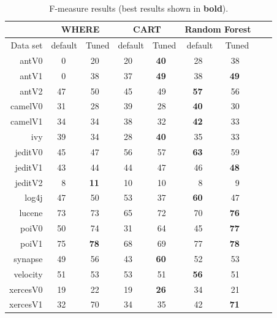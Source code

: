 \documentclass[final,twocolumn,5p]{elsarticle}
\begin{document}
\begin{table}[!t]
\renewcommand{\baselinestretch}{0.8} 
\scriptsize  
~~~\begin{tabular}{r|rl|rl|rl|rl|rl|rlrl}
      &   \multicolumn{4}{c|}{WHERE}         &   \multicolumn{4}{c|}{CART}         &   \multicolumn{4}{c}{Random Forest}         \\\hline
  Data set   &   \multicolumn{2}{c}{default}         &   \multicolumn{2}{c|}{Tuned}         &   \multicolumn{2}{c}{default}         &   \multicolumn{2}{c|}{Tuned}    &   \multicolumn{2}{c}{default}  &   \multicolumn{2}{c}{Tuned}\\\hline
antV0 & 0 &   & 20 &   & 20 &   & {\bf 40} &   & 28 &   & 38 &  \\
antV1 & 0 &   & 38 &   & 37 &   & {\bf 49} &   & 38 &   & {\bf 49} &  \\
antV2 & 47 &   & 50 &   & 45 &   &  49 &   & {\bf 57} &   & 56 &  \\
camelV0 & 31 &   & 28 &   & 39 &   & 28 &   & {\bf 40} &   & 30 &  \\
camelV1 & 34 &   & 34 &   & 38 &   & 32 &   & {\bf 42} &   & 33 &  \\
ivy & 39 &   & 34 &   & 28 &   & {\bf 40} &   & 35 &   &  33 &  \\
jeditV0 & 45 &   & 47 &   & 56 &   & 57 &   & {\bf 63} &   & 59 &  \\
jeditV1 & 43 &   & 44 &   & 44 &   & 47 &   & 46 &   & {\bf 48} &  \\
jeditV2 & 8 &   & {\bf 11} &   & 10 &   & 10 &   & 8 &   & 9 &  \\
log4j & 47 &   & 50 &   & 53 &   & 37 &   & {\bf 60} &   & 47 &  \\
lucene & 73 &   & 73 &   & 65 &   & 72 &   & 70 &   & {\bf 76} &  \\
poiV0 & 50 &   & 74 &   & 31 &   & 64 &   & 45 &   & {\bf 77} &  \\
poiV1 & 75 &   & {\bf 78} &   & 68 &   & 69 &   & 77 &   & {\bf 78} &  \\
synapse & 49 &   & 56 &   & 43 &   & {\bf 60} &   & 52 &   & 53 &  \\
velocity & 51 &   & 53 &   & 53 &   & 51 &   & {\bf 56} &   & 51 &  \\
xercesV0 & 19 &   & 22 &   & 19 &   & {\bf 26} &   & 34 &   & 21 &  \\
xercesV1 & 32 &   & 70 &   & 34 &   & 35 &   & 42 &   & {\bf 71} &  \\
\end{tabular}
\caption{F-measure results (best results  shown in {\bf bold}).}
\label{tab:fbars}
\end{table}
\end{document}
